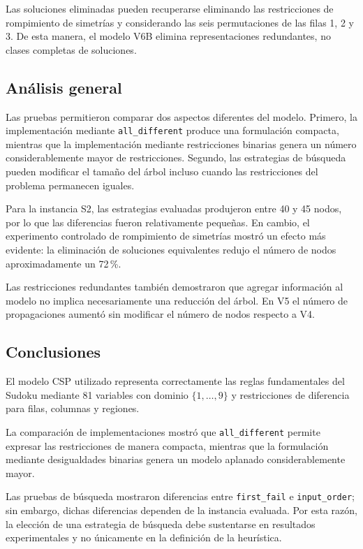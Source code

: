 \documentclass[12pt]{article}
\begin{document}
Las soluciones eliminadas pueden recuperarse eliminando las restricciones de rompimiento de simetrías y considerando las seis permutaciones de las filas 1, 2 y 3. De esta manera, el modelo V6B elimina representaciones redundantes, no clases completas de soluciones.

\subsection{Análisis general}

Las pruebas permitieron comparar dos aspectos diferentes del modelo. Primero, la implementación mediante \texttt{all\_different} produce una formulación compacta, mientras que la implementación mediante restricciones binarias genera un número considerablemente mayor de restricciones. Segundo, las estrategias de búsqueda pueden modificar el tamaño del árbol incluso cuando las restricciones del problema permanecen iguales.

Para la instancia S2, las estrategias evaluadas produjeron entre 40 y 45 nodos, por lo que las diferencias fueron relativamente pequeñas. En cambio, el experimento controlado de rompimiento de simetrías mostró un efecto más evidente: la eliminación de soluciones equivalentes redujo el número de nodos aproximadamente un 72\,\%.

Las restricciones redundantes también demostraron que agregar información al modelo no implica necesariamente una reducción del árbol. En V5 el número de propagaciones aumentó sin modificar el número de nodos respecto a V4.

\subsection{Conclusiones}

El modelo CSP utilizado representa correctamente las reglas fundamentales del Sudoku mediante 81 variables con dominio $\{1,\ldots,9\}$ y restricciones de diferencia para filas, columnas y regiones.

La comparación de implementaciones mostró que \texttt{all\_different} permite expresar las restricciones de manera compacta, mientras que la formulación mediante desigualdades binarias genera un modelo aplanado considerablemente mayor.

Las pruebas de búsqueda mostraron diferencias entre \texttt{first\_fail} e \texttt{input\_order}; sin embargo, dichas diferencias dependen de la instancia evaluada. Por esta razón, la elección de una estrategia de búsqueda debe sustentarse en resultados experimentales y no únicamente en la definición de la heurística.
\end{document}
